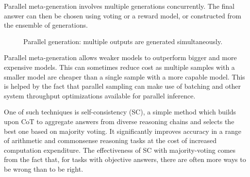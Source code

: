 Parallel meta-generation involves multiple generations concurrently. 
The final answer can then be chosen using voting or a reward model, or constructed from the ensemble of generations\cite{welleck2024decodingmetagenerationinferencetimealgorithms}.

\begin{figure}[ht]
    \centering
    \caption{Parallel generation: multiple outputs are generated simultaneously.}
    \label{fig:parallel_generation}
\end{figure}

Parallel meta-generation allows weaker models to outperform bigger and more expensive models\cite{brown2024largelanguagemonkeysscaling}.
This can sometimes reduce cost as multiple samples with a smaller model are cheaper than a single sample with a more capable model.
This is helped by the fact that parallel sampling can make use of batching and other system throughput optimizations
available for parallel inference\cite{brown2024largelanguagemonkeysscaling}.

One of such techniques is self-consistency\cite{wang2023selfconsistencyimproveschainthought} (SC),
a simple method which builds upon CoT to aggregate answers from diverse reasoning 
chains and selects the best one based on majority voting. 
It significantly improves accuracy in a range of arithmetic and commonsense reasoning tasks 
at the cost of increased computation expenditure\cite{wang2023selfconsistencyimproveschainthought}.
The effectiveness of SC with majority-voting comes from the fact that, for tasks with objective answers, there are often more ways to be wrong than to be right.

